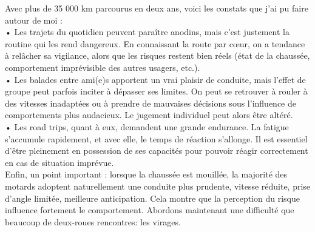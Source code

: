 \vspace{0.5cm}
Avec plus de 35 000 km parcourus en deux ans, voici les constats que j’ai pu faire autour de moi :\\
• Les trajets du quotidien peuvent paraître anodins, mais c’est justement la routine qui les rend dangereux. En connaissant la route par cœur, on a tendance à relâcher sa vigilance, alors que les risques restent bien réels (état de la chaussée, comportement imprévisible des autres usagers, etc.).\\
•	Les balades entre ami(e)s apportent un vrai plaisir de conduite, mais l’effet de groupe peut parfois inciter à dépasser ses limites. On peut se retrouver à rouler à des vitesses inadaptées ou à prendre de mauvaises décisions sous l’influence de comportements plus audacieux. Le jugement individuel peut alors être altéré.\\
•	Les road trips, quant à eux, demandent une grande endurance. La fatigue s’accumule rapidement, et avec elle, le temps de réaction s’allonge. Il est essentiel d’être pleinement en possession de ses capacités pour pouvoir réagir correctement en cas de situation imprévue.\\

Enfin, un point important : lorsque la chaussée est mouillée, la majorité des motards adoptent naturellement une conduite plus prudente, vitesse réduite, prise d’angle limitée, meilleure anticipation. Cela montre que la perception du risque influence fortement le comportement. %
Abordons maintenant une difficulté que beaucoup de deux-roues rencontres: les virages.

